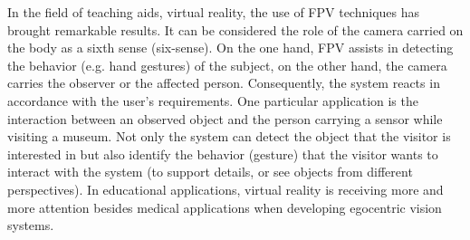 In the field of teaching aids, virtual reality, the use of FPV techniques has brought remarkable results. It can be considered the role of the camera carried on the body as a sixth sense (six-sense). On the one hand, FPV assists in detecting the behavior (e.g. hand gestures) of the subject, on the other hand, the camera carries the observer or the affected person. Consequently, the system  reacts in accordance with the user's requirements. One particular application is the interaction between an observed object and the person carrying a sensor while visiting a museum. Not only the system can detect the object that the visitor is interested in but also identify the behavior (gesture) that the visitor wants to interact with the system (to support details, or see objects from different perspectives). In educational applications, virtual reality is receiving more and more attention besides medical applications when developing egocentric vision systems.
